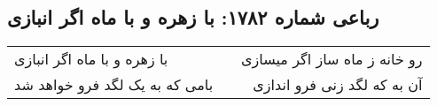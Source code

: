 \begin{center}
\section*{رباعی شماره ۱۷۸۲: با زهره و با ماه اگر انبازی}
\label{sec:1782}
\begin{longtable}{l p{0.5cm} r}
با زهره و با ماه اگر انبازی
&&
رو خانه ز ماه ساز اگر میسازی
\\
بامی که به یک لگد فرو خواهد شد
&&
آن به که لگد زنی فرو اندازی
\\
\end{longtable}
\end{center}
